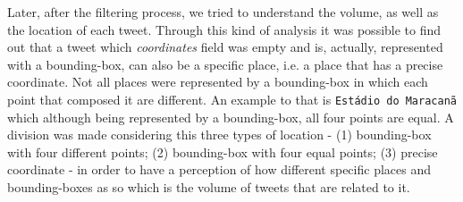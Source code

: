 Later, after the filtering process, we tried to understand the volume, as well as the location of each tweet. Through this kind of analysis it was possible to find out that a tweet which \textit{coordinates }field was empty and is, actually, represented with a bounding-box, can also be a specific place, i.e. a place that has a precise coordinate. Not all places were represented by a bounding-box in which each point that composed it are different. An example to that is \texttt{Estádio do Maracanã} which although being represented by a bounding-box, all four points are equal. A division was made considering this three types of location - (1) bounding-box with four different points; (2) bounding-box with four equal points; (3) precise coordinate - in order to have a perception of how different specific places and bounding-boxes as so which is the volume of tweets that are related to it.

\begin{table}[htbp]
	\centering
	\caption{Volume of tweets for each type of geo-location}
	\label{tab:volume_geolocation}
	\end{table}
	
